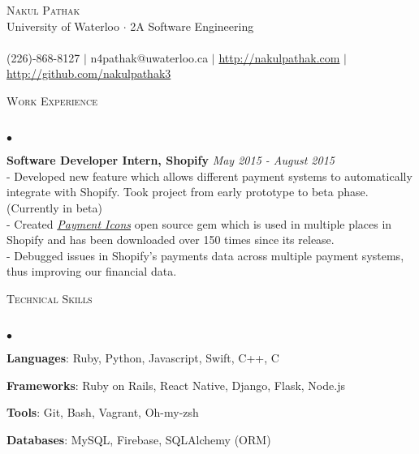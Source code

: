 \documentclass[10pt]{article}
\newcommand{\lineunder}{\vspace*{-8pt} \\ \hspace*{-18pt} \hrulefill \\}
\newcommand{\header}[1]{{\hspace*{-15pt}\vspace*{6pt} \textsc{#1}} \vspace*{-6pt} \lineunder}
\newenvironment{achievements}{\begin{list}{$\bullet$}{\topsep 0pt \itemsep -1.5pt \leftmargin 5pt}}{\vspace*{4pt}\end{list}}
\begin{document}
\small
\smallskip
\vspace*{-45pt}

\begin{center}
	{\Huge \scshape {Nakul Pathak}} \\
\vspace*{6pt} 
{\fontsize{10}{1}\selectfont University of Waterloo $\cdot$ 2A Software Engineering} \\
\vspace{-4pt}
\hspace*{-18pt} \hrulefill \\
\vspace{2pt}
\hspace*{-18pt} (226)-868-8127 $|$ n4pathak@uwaterloo.ca $|$ \url{http://nakulpathak.com} $|$  \url{http://github.com/nakulpathak3}
\vspace{-5pt}
\end{center}

\header{\normalsize Work Experience}
\begin{achievements}
\item \textbf{Software Developer Intern, Shopify} \hfill \textit {May 2015 - August 2015}
\\- Developed new feature which allows different payment systems to automatically integrate with Shopify. Took project from early prototype to beta phase. (Currently in beta)
\\ -  Created \textit{\href{https://github.com/activemerchant/payment_icons}{Payment Icons}} open source gem which is used in multiple places in Shopify and has been downloaded over 150 times since its release.
\\ -  Debugged issues in Shopify's payments data across multiple payment systems, thus improving our financial data.
\end{achievements}

\vspace{5pt}

\header{\normalsize Technical Skills}
\begin{achievements}
\item \textbf{Languages}: Ruby, Python, Javascript, Swift, C++, C
\item \textbf{Frameworks}: Ruby on Rails, React Native, Django, Flask, Node.js
\item \textbf{Tools}: Git, Bash, Vagrant, Oh-my-zsh
\item \textbf{Databases}: MySQL, Firebase, SQLAlchemy (ORM)
\end{achievements}
\end{document}
